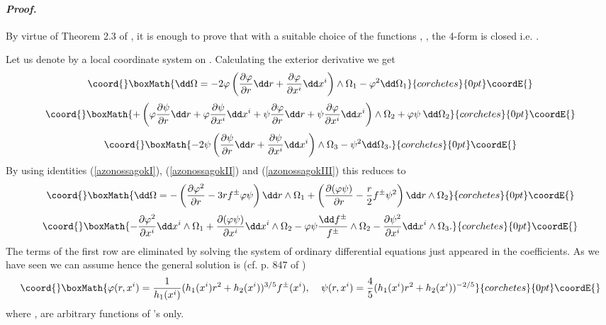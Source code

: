 \documentclass[a4paper,12pt,draft]{article}
\newenvironment{proof}{\paragraph{\it Proof.}}{\myHighlight{$\square$}\coordHE{}\vskip0.4cm}
\begin{document}
\begin{proof} By virtue of Theorem 2.3 of \cite{bry-sal}, it is enough to
prove that with a suitable choice of the functions \myHighlight{$\varphi$}\coordHE{}, \myHighlight{$\psi$}\coordHE{}, the
4-form \myHighlight{$\Omega$}\coordHE{} is closed i.e. \coordHE{}. 

Let us denote by \coordHE{} a local coordinate
system on \coordHE{}. Calculating the exterior derivative we get
\[\coord{}\boxMath{\dd\Omega =-2\varphi\left({\partial\varphi\over\partial
r}\dd
r+{\partial\varphi\over\partial x^i}\dd x^i\right)
\wedge\Omega_1-\varphi^2\dd\Omega_1}{corchetes}{0pt}\coordE{}\]
\[\coord{}\boxMath{+\left(\varphi{\partial\psi\over\partial r}\dd r
+\varphi{\partial\psi\over\partial x^i}\dd x^i
+\psi{\partial\varphi\over\partial r}\dd r +
\psi{\partial\varphi\over\partial x^i}\dd
x^i\right)\wedge\Omega_2+\varphi\psi\:\dd\Omega_2}{corchetes}{0pt}\coordE{}\]
\[\coord{}\boxMath{-2\psi\left({\partial\psi\over\partial r}\dd
r+{\partial\psi\over\partial x^i}\dd
x^i\right)\wedge\Omega_3-\psi^2\dd\Omega_3.}{corchetes}{0pt}\coordE{}\]
By using identities (\ref{azonossagokI}), (\ref{azonossagokII}) and
(\ref{azonossagokIII}) this reduces to
\[\coord{}\boxMath{\dd\Omega =-\left({\partial\varphi^2\over\partial
r}-3rf^\pm\varphi\psi\right)\dd
r\wedge\Omega_1+\left({\partial (\varphi\psi )\over \partial r}-{r\over
2}f^\pm\psi^2\right)\dd r\wedge\Omega_2}{corchetes}{0pt}\coordE{}\]
\[\coord{}\boxMath{-{\partial \varphi^2\over\partial x^i}\dd x^i\wedge\Omega_1+{\partial
(\varphi\psi )\over\partial x^i}\dd
x^i\wedge\Omega_2-\varphi\psi{\dd f^\pm\over
f^\pm}\wedge\Omega_2-{\partial\psi^2\over\partial x^i}\dd
x^i\wedge\Omega_3.}{corchetes}{0pt}\coordE{}\]
The terms of the first row are eliminated by solving the system of
ordinary differential equations just appeared in the coefficients. As we
have seen we can assume \coordHE{} hence the general solution is
(cf. p. 847
of \cite{bry-sal})
\[\coord{}\boxMath{\varphi (r, x^i) ={1\over
h_1(x^i)}(h_1(x^i)r^2+h_2(x^i))^{3/5}f^\pm (x^i),
\:\:\:\:\:\psi (r, x^i)={4\over 5}(h_1(x^i)r^2+h_2(x^i))^{-2/5}}{corchetes}{0pt}\coordE{}\]
where \coordHE{}, \coordHE{} are arbitrary functions of \coordHE{}'s only.


\end{proof}
\end{document}
